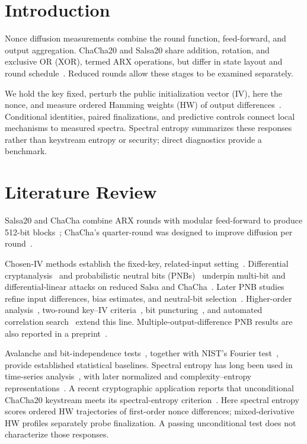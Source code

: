 \documentclass[electronics,article,submit,pdftex,oneauthor]{Definitions/mdpi}
\begin{document}
\section{Introduction}

Nonce diffusion measurements combine the round function, feed-forward, and output aggregation. ChaCha20 and Salsa20 share addition, rotation, and exclusive OR (XOR), termed ARX operations, but differ in state layout and round schedule~\citep{nir2018,bernstein2008salsa}. Reduced rounds allow these stages to be examined separately.

We hold the key fixed, perturb the public initialization vector (IV), here the nonce, and measure ordered Hamming weights (HW) of output differences~\citep{englund2007,fischer2008}. Conditional identities, paired finalizations, and predictive controls connect local mechanisms to measured spectra. Spectral entropy summarizes these responses rather than keystream entropy or security; direct diagnostics provide a benchmark.

\section{Literature Review}\label{sec:literature}\label{sec:related}

Salsa20 and ChaCha combine ARX rounds with modular feed-forward to produce 512-bit blocks~\citep{bernstein2008salsa,estream2008,nir2018}; ChaCha's quarter-round was designed to improve diffusion per round~\citep{bernstein2008chacha}.

Chosen-IV methods establish the fixed-key, related-input setting~\citep{englund2007,fischer2008,maitra2016}. Differential cryptanalysis~\citep{biham1991} and probabilistic neutral bits (PNBs)~\citep{aumasson2008} underpin multi-bit and differential-linear attacks on reduced Salsa and ChaCha~\citep{choudhuri2016,dey2017,beierle2020,coutinho2023}. Later PNB studies refine input differences, bias estimates, and neutral-bit selection~\citep{ghafoori2023,dey2024salsa,dey2024tit}. Higher-order analysis~\citep{ghafoori2024hodl}, two-round key--IV criteria~\citep{dey2025tosc}, bit puncturing~\citep{florez2025}, and automated correlation search~\citep{liu2026} extend this line. Multiple-output-difference PNB results are also reported in a preprint~\citep{paul2025}.

Avalanche and bit-independence tests~\citep{webster1986,hernandez2005,madarro2024}, together with NIST's Fourier test~\citep{nist2010}, provide established statistical baselines. Spectral entropy has long been used in time-series analysis~\citep{powell1979,inouye1991}, with later normalized and complexity--entropy representations~\citep{zaccarelli2013,dai2018,mao2018}. A recent cryptographic application reports that unconditional ChaCha20 keystream meets its spectral-entropy criterion~\citep{kasyanov2026}. Here spectral entropy scores ordered HW trajectories of first-order nonce differences; mixed-derivative HW profiles separately probe finalization. A passing unconditional test does not characterize those responses.
\end{document}
